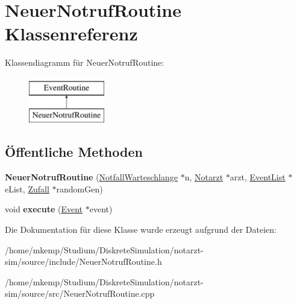 \hypertarget{classNeuerNotrufRoutine}{}\section{Neuer\+Notruf\+Routine Klassenreferenz}
\label{classNeuerNotrufRoutine}
Klassendiagramm für Neuer\+Notruf\+Routine\+:\begin{figure}[H]
\begin{center}
\leavevmode
\includegraphics[height=2.000000cm]{classNeuerNotrufRoutine}
\end{center}
\end{figure}
\subsection*{Öffentliche Methoden}
\begin{DoxyCompactItemize}
\item 
{\bfseries Neuer\+Notruf\+Routine} (\hyperlink{classNotfallWarteschlange}{Notfall\+Warteschlange} $\ast$n, \hyperlink{classNotarzt}{Notarzt} $\ast$arzt, \hyperlink{classEventList}{Event\+List} $\ast$e\+List, \hyperlink{classZufall}{Zufall} $\ast$random\+Gen)\hypertarget{classNeuerNotrufRoutine_a80f789ceb242c142833658db7f28a686}{}\label{classNeuerNotrufRoutine_a80f789ceb242c142833658db7f28a686}

\item 
void {\bfseries execute} (\hyperlink{classEvent}{Event} $\ast$event)\hypertarget{classNeuerNotrufRoutine_af2d883cecce5e012c9332c933c1cb10f}{}\label{classNeuerNotrufRoutine_af2d883cecce5e012c9332c933c1cb10f}

\end{DoxyCompactItemize}


Die Dokumentation für diese Klasse wurde erzeugt aufgrund der Dateien\+:\begin{DoxyCompactItemize}
\item 
/home/mkemp/\+Studium/\+Diskrete\+Simulation/notarzt-\/sim/source/include/Neuer\+Notruf\+Routine.\+h\item 
/home/mkemp/\+Studium/\+Diskrete\+Simulation/notarzt-\/sim/source/src/Neuer\+Notruf\+Routine.\+cpp\end{DoxyCompactItemize}

